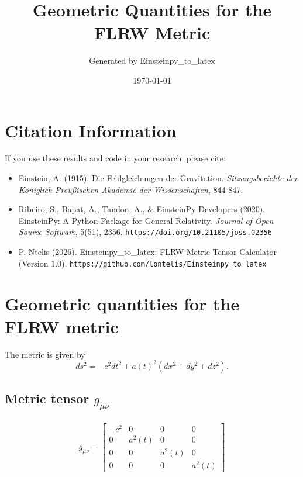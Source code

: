 \documentclass{article}
\begin{document}

\title{Geometric Quantities for the FLRW Metric}
\author{Generated by Einsteinpy\_to\_latex}
\date{\today}
\maketitle

\section*{Citation Information}
If you use these results and code in your research, please cite:
\begin{itemize}
\item Einstein, A. (1915). Die Feldgleichungen der Gravitation. 
      \textit{Sitzungsberichte der K\"oniglich Preu\ss ischen Akademie der Wissenschaften}, 844-847.
\item Ribeiro, S., Bapat, A., Tandon, A., \& EinsteinPy Developers (2020).
      EinsteinPy: A Python Package for General Relativity.
      \textit{Journal of Open Source Software}, 5(51), 2356.
      \texttt{https://doi.org/10.21105/joss.02356}
\item P. Ntelis (2026). Einsteinpy\_to\_latex: FLRW Metric Tensor Calculator (Version 1.0).
      \texttt{https://github.com/lontelis/Einsteinpy\_to\_latex}
\end{itemize}

\section{Geometric quantities for the FLRW metric}

The metric is given by
\[
ds^2 = -c^2 dt^2 + a(t)^2 (dx^2+dy^2+dz^2) .
\]

\subsection{Metric tensor $g_{\mu\nu}$}
\begin{align} g_{\mu\nu}= 
\left[\begin{matrix}- c^{2} & 0 & 0 & 0\\0 & a^{2}{\left(t \right)} & 0 & 0\\0 & 0 & a^{2}{\left(t \right)} & 0\\0 & 0 & 0 & a^{2}{\left(t \right)}\end{matrix}\right]
\end{align}
\end{document}
